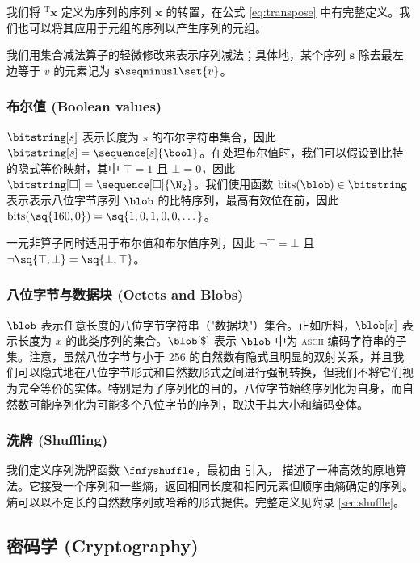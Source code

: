 我们将 ${}^\text{T}\mathbf{x}$ 定义为序列的序列 $\mathbf{x}$ 的转置，在公式 \ref{eq:transpose} 中有完整定义。我们也可以将其应用于元组的序列以产生序列的元组。

我们用集合减法算子的轻微修改来表示序列减法；具体地，某个序列 $\mathbf{s}$ 除去最左边等于 $v$ 的元素记为 $\mathbf{s}\seqminusl\set{v}$。

\subsubsection{布尔值 (Boolean values)}
$\bitstring[s]$ 表示长度为 $s$ 的布尔字符串集合，因此 $\bitstring[s] = \sequence[s]{\bool}$。在处理布尔值时，我们可以假设到比特的隐式等价映射，其中 $\top = 1$ 且 $\bot = 0$，因此 $\bitstring[\Box] = \sequence[\Box]{\N_2}$。我们使用函数 $\text{bits}(\blob) \in \bitstring$ 表示表示八位字节序列 $\blob$ 的比特序列，最高有效位在前，因此 $\text{bits}(\sq{160, 0}) = \sq{1, 0, 1, 0, 0, \dots}$。

一元非算子同时适用于布尔值和布尔值序列，因此 $\neg \top = \bot$ 且 $\neg \sq{\top, \bot} = \sq{\bot, \top}$。

\subsubsection{八位字节与数据块 (Octets and Blobs)}

$\blob$ 表示任意长度的八位字节字符串（"数据块"）集合。正如所料，$\blob[x]$ 表示长度为 $x$ 的此类序列的集合。$\blob[\$]$ 表示 $\blob$ 中为 \textsc{ascii} 编码字符串的子集。注意，虽然八位字节与小于 256 的自然数有隐式且明显的双射关系，并且我们可以隐式地在八位字节形式和自然数形式之间进行强制转换，但我们不将它们视为完全等价的实体。特别是为了序列化的目的，八位字节始终序列化为自身，而自然数可能序列化为可能多个八位字节的序列，取决于其大小和编码变体。

\subsubsection{洗牌 (Shuffling)}

我们定义序列洗牌函数 $\fnfyshuffle$，最初由 \cite{fisheryates1938statistical} 引入，\cite{wikipedia2024fisheryates} 描述了一种高效的原地算法。它接受一个序列和一些熵，返回相同长度和相同元素但顺序由熵确定的序列。熵可以以不定长的自然数序列或哈希的形式提供。完整定义见附录 \ref{sec:shuffle}。

\subsection{密码学 (Cryptography)}\label{sec:cryptography}

